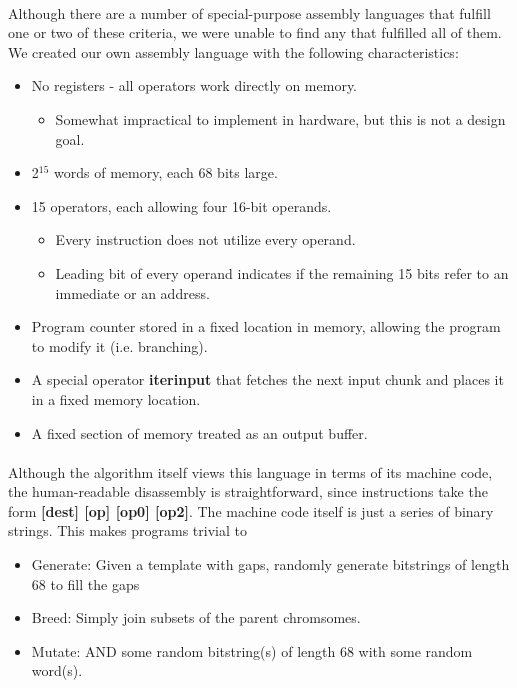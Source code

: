 \documentclass{article}
\begin{document}
\paragraph{}
 
Although there are a number of special-purpose assembly languages that fulfill one or two of these criteria, we were unable to find any that fulfilled all of them. We created our own assembly language with the following characteristics:

\begin{itemize}
\item No registers - all operators work directly on memory.
	\begin{itemize}
          \item Somewhat impractical to implement in hardware, but this is not a design goal.
	\end{itemize}
\item 2$^{15}$ words of memory, each 68 bits large.
\item 15 operators, each allowing four 16-bit operands.
	\begin{itemize}
          \item Every instruction does not utilize every operand.
          \item Leading bit of every operand indicates if the remaining 15 bits refer to an immediate or an address.
	\end{itemize}
\item Program counter stored in a fixed location in memory, allowing the program to modify it (i.e. branching).
\item A special operator \textbf{iterinput} that fetches the next input chunk and places it in a fixed memory location.
\item A fixed section of memory treated as an output buffer.
\end{itemize}

\paragraph{} 
Although the algorithm itself views this language in terms of its machine code, the human-readable disassembly is straightforward, since instructions take the form \textbf{[dest] [op] [op0] [op2]}. The machine code itself is just a series of binary strings. This makes programs trivial to
	\begin{itemize}
	\item Generate: Given a template with gaps, randomly generate bitstrings of length 68 to fill the gaps
	\item Breed: Simply join subsets of the parent chromsomes.
	\item Mutate: AND some random bitstring(s) of length 68 with some random word(s).
	\end{itemize}
\end{document}
